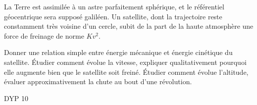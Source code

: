 \begin{Exercise}[title=Freinage d'un satellite dans l'atmosphère]
  La Terre est assimilée à un astre parfaitement sphérique, et le référentiel géocentrique sera supposé galiléen. Un satellite, dont la trajectoire reste constamment très voisine d'un cercle, subit de la part de la haute atmosphère une force de freinage de norme $Kv^2$.

        Donner une relation simple entre énergie mécanique et énergie cinétique du satellite. Étudier comment évolue la vitesse, expliquer qualitativement pourquoi elle augmente bien que le satellite soit freiné. Étudier comment évolue l'altitude, évaluer approximativement la chute au bout d'une révolution.

\end{Exercise}
\begin{Answer}
DYP 10
\end{Answer}
